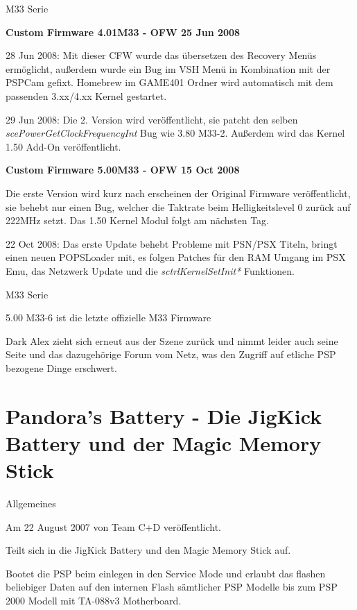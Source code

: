 \documentclass[mode=print,paper=screen,size=10pt,style=paintings]{powerdot}
\begin{document}
\begin{slide}{M33 Serie}
	\begin{large}\textbf{Custom Firmware 4.01M33 - OFW 25 Jun 2008}\end{large}	
	\begin{list}{-}{}
		\item{28 Jun 2008: Mit dieser CFW wurde das übersetzen des Recovery Menüs ermöglicht, außerdem wurde ein Bug im VSH Menü
			in Kombination mit der PSPCam gefixt. Homebrew im GAME401 Ordner wird automatisch mit dem passenden 3.xx/4.xx Kernel
			gestartet.}
		\item{29 Jun 2008: Die 2. Version wird veröffentlicht, sie patcht den selben \textit{scePowerGetClockFrequencyInt} Bug 
			wie 3.80 M33-2. Außerdem wird das Kernel 1.50 Add-On veröffentlicht.}
	\end{list}
	\begin{large}\textbf{Custom Firmware 5.00M33 - OFW 15 Oct 2008}\end{large}	
	\begin{list}{-}{}
		\item{Die erste Version wird kurz nach erscheinen der Original Firmware veröffentlicht, sie behebt nur einen Bug, 
			welcher die Taktrate beim Helligkeitslevel 0 zurück auf 222MHz setzt. Das 1.50 Kernel Modul folgt am nächsten Tag.}
		\item{22 Oct 2008: Das erste Update behebt Probleme mit PSN/PSX Titeln, bringt einen neuen POPSLoader mit, es folgen
			Patches für den RAM Umgang im PSX Emu, das Netzwerk Update und die \textit{sctrlKernelSetInit*} Funktionen.}
	\end{list}
\end{slide}

\begin{slide}{M33 Serie}
	\begin{list}{-}{}	
		\item{5.00 M33-6 ist die letzte offizielle M33 Firmware}
		\item{Dark Alex zieht sich erneut aus der Szene zurück und nimmt leider auch seine Seite und das dazugehörige Forum vom
			Netz, was den Zugriff auf etliche PSP bezogene Dinge erschwert.}
	\end{list}
\end{slide}



\section{Pandora's Battery - Die JigKick Battery und der Magic Memory Stick}
\begin{slide}{Allgemeines}
	\begin{list}{-}{}
		\item{Am 22 August 2007 von Team C+D veröffentlicht.}
		\item{Teilt sich in die JigKick Battery und den Magic Memory Stick auf.}
		\item{Bootet die PSP beim einlegen in den Service Mode und erlaubt das flashen beliebiger Daten auf den internen Flash
			sämtlicher PSP Modelle bis zum PSP 2000 Modell mit TA-088v3 Motherboard.}
	\end{list}
\end{slide}
\end{document}
